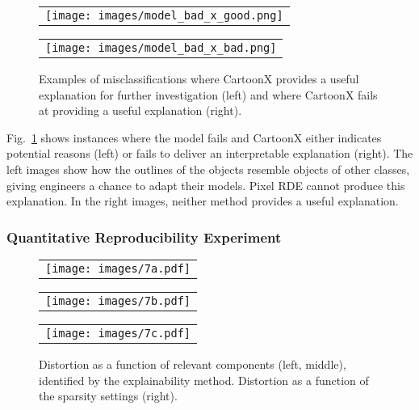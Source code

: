 \begin{figure}
    \centering
    \begin{tabular}{@{}c@{}}
        \texttt{[image: images/model\_bad\_x\_good.png]}
    \end{tabular}
    \hspace{5mm}
    \begin{tabular}{@{}c@{}}
        \texttt{[image: images/model\_bad\_x\_bad.png]}
    \end{tabular}
    \caption{Examples of misclassifications where CartoonX provides a useful explanation for further investigation (left) and where CartoonX fails at providing a useful explanation (right).}
    \label{fig:model_bad}
\end{figure}

Fig.~\ref{fig:model_bad} shows instances where the model fails and CartoonX either indicates potential reasons (left) or fails to deliver an interpretable explanation (right).
The left images show how the outlines of the objects resemble objects of other classes, giving engineers a chance to adapt their models. 
Pixel RDE cannot produce this explanation.
In the right images, neither method provides a useful explanation.

\subsubsection{Quantitative Reproducibility Experiment}

\begin{figure}
    \centering
    \begin{tabular}{@{}c@{}}
        \texttt{[image: images/7a.pdf]}
    \end{tabular}
    \begin{tabular}{@{}c@{}}
        \texttt{[image: images/7b.pdf]}
    \end{tabular}
    \begin{tabular}{@{}c@{}}
        \texttt{[image: images/7c.pdf]}
    \end{tabular}
    \caption{Distortion as a function of relevant components (left, middle), identified by the explainability method. Distortion as a function of the sparsity settings (right).}
    \label{fig:repro_figure7}
\end{figure}

